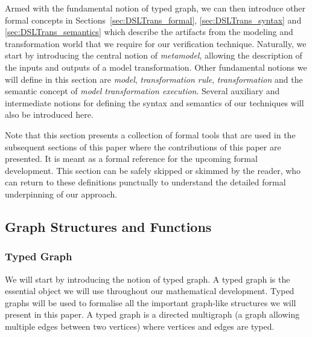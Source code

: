 

Armed with the fundamental notion of typed graph, we can then introduce other formal concepts in Sections~\ref{sec:DSLTrans_formal}, \ref{sec:DSLTrans_syntax} and \ref{sec:DSLTrans_semantics} which describe the artifacts from the modeling and transformation world that we require for our verification technique. Naturally, we start by introducing the central notion of \emph{metamodel}, allowing the description of the inputs and outputs of a model transformation. Other fundamental notions we will define in this section are \emph{model}, \emph{transformation rule}, \emph{transformation} and the semantic concept of \emph{model transformation execution}. Several auxiliary and intermediate notions for defining the syntax and semantics of our techniques will also be introduced here. 

Note that this section presents a collection of formal tools that are used in the subsequent sections of this paper where the contributions of this paper are presented. It is meant as a formal reference for the upcoming formal development. This section can be safely skipped or skimmed by the reader, who can return to these definitions punctually to understand the detailed formal underpinning of our approach. 

    
\subsection{Graph Structures and Functions}
\label{sec:typed_graphs}


\subsubsection*{Typed Graph}
We will start by introducing the notion of typed graph. A typed graph is the essential object we will use throughout our mathematical development. Typed graphs will be used to formalise all the important graph-like structures we will present in this paper. A typed graph is a directed multigraph (a graph allowing multiple edges between two vertices) where vertices and edges are typed.


